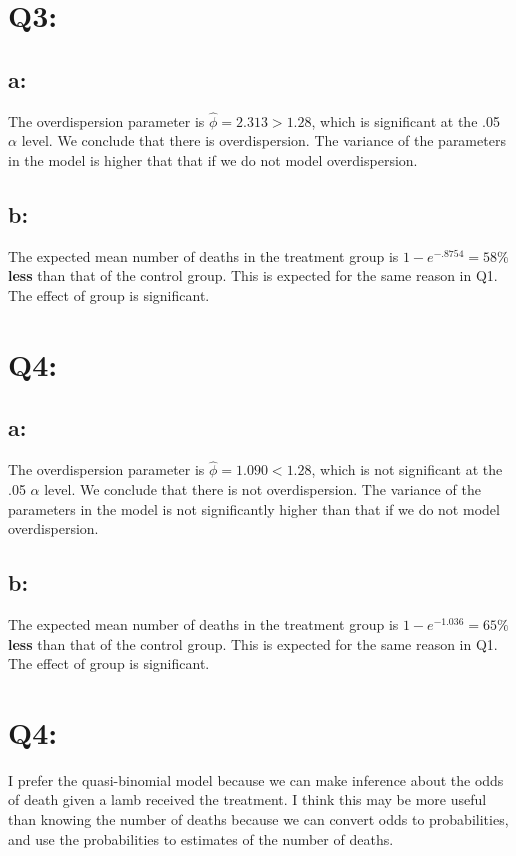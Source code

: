 \documentclass{article}
\def\beginmyfig{\begin{figure}[htbp]\begin{center}}
\def\endmyfig{\end{center}\end{figure}}
\begin{document}
\section*{Q3:}
\subsection*{a:}
The overdispersion parameter is $\hat\phi=2.313 > 1.28$, which is
significant at the .05 $\alpha$ level. We conclude that there is
overdispersion. The variance of the parameters in the model is higher that
that if we do not model overdispersion.

\subsection*{b:}
The expected mean number of deaths in the treatment group is $1-e^{-.8754}
= 58\%$ \textbf{less} than that of the control group. This is expected for
the same reason in Q1. The effect of group is significant.

\section*{Q4:}
\subsection*{a:}
The overdispersion parameter is $\hat\phi=1.090 < 1.28$, which is not
significant at the .05 $\alpha$ level. We conclude that there is not
overdispersion. The variance of the parameters in the model is not significantly higher than that if we do not model overdispersion.

\subsection*{b:}
The expected mean number of deaths in the treatment group is $1-e^{-1.036}
= 65\%$ \textbf{less} than that of the control group. This is expected for
the same reason in Q1. The effect of group is significant.

\section*{Q4:}
I prefer the quasi-binomial model because we can make inference about the odds of death given a lamb received the treatment. I think this may be more useful than knowing the number of deaths because we can convert odds to probabilities, and use the probabilities to estimates of the number of deaths.

\end{document}
